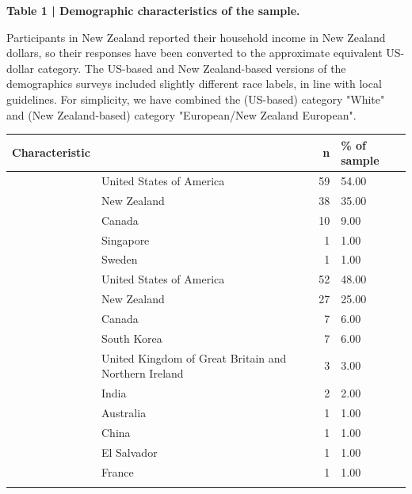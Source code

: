 \documentclass[
]{article}
\begin{document}
\clearpage

\begingroup\fontsize{6}{8}\selectfont

\begin{ThreePartTable}
\begin{TableNotes}[para]
\item \textbf{Table 1 | Demographic characteristics of the sample. } 
\item Participants in New Zealand reported their household income in New Zealand dollars, so their responses have been converted to the approximate equivalent US-dollar category. The US-based and New Zealand-based versions of the demographics surveys included slightly different race labels, in line with local guidelines. For simplicity, we have combined the (US-based) category "White" and (New Zealand-based) category "European/New Zealand European".
\end{TableNotes}
\begin{longtable}{llrl}
\toprule
Characteristic &   & n & \% of sample\\
\midrule
 & United States of America & 59 & 54.00\\
\cmidrule{2-4}\nopagebreak
 & New Zealand & 38 & 35.00\\
\cmidrule{2-4}\nopagebreak
 & Canada & 10 & 9.00\\
\cmidrule{2-4}\nopagebreak
 & Singapore & 1 & 1.00\\
\cmidrule{2-4}\nopagebreak
\multirow{-5}{*}{\raggedright\arraybackslash Country of residence} & Sweden & 1 & 1.00\\
\cmidrule{1-4}\pagebreak[0]
 & United States of America & 52 & 48.00\\
\cmidrule{2-4}\nopagebreak
 & New Zealand & 27 & 25.00\\
\cmidrule{2-4}\nopagebreak
 & Canada & 7 & 6.00\\
\cmidrule{2-4}\nopagebreak
 & South Korea & 7 & 6.00\\
\cmidrule{2-4}\nopagebreak
 & United Kingdom of Great Britain and Northern Ireland & 3 & 3.00\\
\cmidrule{2-4}\nopagebreak
 & India & 2 & 2.00\\
\cmidrule{2-4}\nopagebreak
 & Australia & 1 & 1.00\\
\cmidrule{2-4}\nopagebreak
 & China & 1 & 1.00\\
\cmidrule{2-4}\nopagebreak
 & El Salvador & 1 & 1.00\\
\cmidrule{2-4}\nopagebreak
 & France & 1 & 1.00\\
\cmidrule{2-4}\nopagebreak

\end{longtable}
\end{ThreePartTable}
\end{document}
